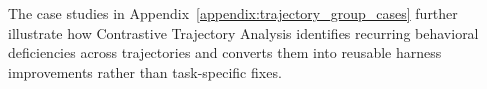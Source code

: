 \documentclass{article} %
\begin{document}
The case studies in Appendix~\ref{appendix:trajectory_group_cases} further illustrate how Contrastive Trajectory Analysis identifies recurring behavioral deficiencies across trajectories and converts them into reusable harness improvements rather than task-specific fixes.












\end{document}
